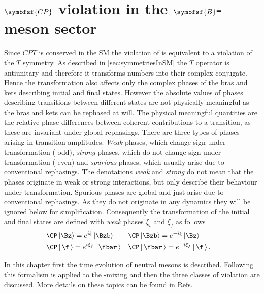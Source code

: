 \chapter[head={\CP violation in the $B$-meson sector},tocentry={$\symbfsf{C{}P}$ violation in the $\symbfsf{B}$-meson sector}]
{$\symbfsf{C{}P}$ violation in the $\symbfsf{B}$-meson sector}
\label{chap:CPV}

Since $CPT$ is conserved in the \ac{SM} the violation of \CP is equivalent to a violation of the $T$ symmetry.
As described in \cref{sec:symmetriesInSM} the $T$ operator is antiunitary and therefore it transforms numbers into their complex conjugate.
Hence the \CP transformation also affects only the complex phases of the bras and kets describing initial and final states.
However the absolute values of phases describing transitions between different states are not physically meaningful as the bras and kets can be rephased at will.
The physical meaningful quantities are the relative phase differences between coherent contributions to a transition, as these are invariant under global rephasings.
There are three types of phases arising in transition amplitudes:
\emph{Weak} phases, which change sign under \CP transformation (\CP-odd), \emph{strong} phases, which do not change sign under \CP transformation (\CP-even) and \emph{spurious} phases, which usually arise due to conventional rephasings.
The denotations \emph{weak} and \emph{strong} do not mean that the phases originate in weak or strong interactions, but only describe their behaviour under \CP transformation.
Spurious phases are global and just arise due to conventional rephasings.
As they do not originate in any dynamics they will be ignored below for simplification.
Consequently the \CP transformation of the initial and final states are defined with \emph{weak} phases $\xi_i$ and $\xi_f$ as follows
\begin{equation}
\begin{aligned}
&\CP\left|\Bz\right> =e^{i\xi}\left|\Bzb\right>&&\CP\left|\Bzb\right>=e^{-i\xi}\left|\Bz\right>&\\
&\CP\left|\,\f\,\right> =e^{i\xi_f}\left|\,\fbar\,\right>&&\CP\left|\,\fbar\,\right>=e^{-i\xi_f}\left|\,\f\,\right>.& \label{eq:CPTransInitFinal}
\end{aligned}
\end{equation}

In this chapter first the time evolution of neutral mesons is described.
Following this formalism is applied to the \Bz-\Bzb mixing and then the three classes of \CP violation are discussed.
More details on these topics can be found in Refs.~\cite{Branco:396964,Bigi:1295518}

